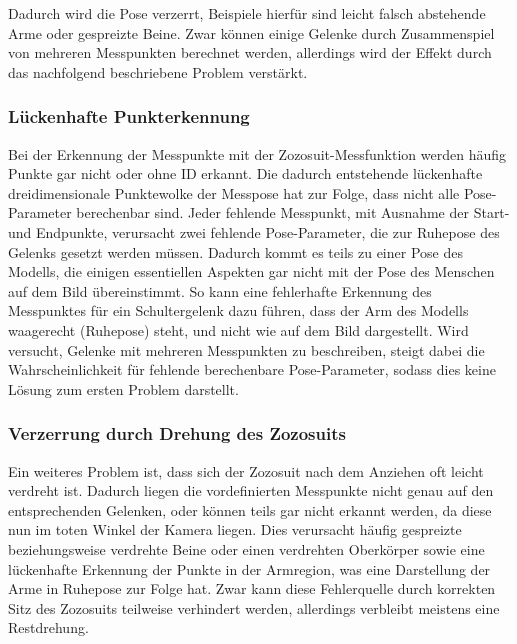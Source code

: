 Dadurch wird die Pose verzerrt, Beispiele hierfür sind leicht falsch abstehende Arme oder gespreizte Beine. Zwar können 
einige Gelenke durch Zusammenspiel von mehreren Messpunkten berechnet werden, allerdings 
wird der Effekt durch das nachfolgend beschriebene Problem verstärkt.

\subsubsection*{Lückenhafte Punkterkennung}
Bei der Erkennung der Messpunkte mit der Zozosuit-Messfunktion werden häufig Punkte gar nicht oder ohne
ID erkannt. Die dadurch entstehende lückenhafte dreidimensionale Punktewolke der Messpose hat zur Folge, dass
nicht alle Pose-Parameter berechenbar sind. Jeder fehlende Messpunkt, mit Ausnahme der Start- und Endpunkte, 
verursacht zwei fehlende Pose-Parameter, die zur Ruhepose des Gelenks gesetzt werden müssen. Dadurch kommt es teils
zu einer Pose des Modells, die einigen essentiellen Aspekten gar nicht mit der Pose des Menschen auf dem Bild übereinstimmt.
So kann eine fehlerhafte Erkennung des Messpunktes für ein Schultergelenk dazu führen, dass der Arm des Modells 
waagerecht (Ruhepose) steht, und nicht wie auf dem Bild dargestellt.
Wird versucht, Gelenke mit mehreren Messpunkten zu beschreiben, steigt dabei 
die Wahrscheinlichkeit für fehlende berechenbare Pose-Parameter, sodass dies keine Lösung zum ersten Problem darstellt.


\subsubsection*{Verzerrung durch Drehung des Zozosuits}
Ein weiteres Problem ist, dass sich der Zozosuit nach dem Anziehen oft leicht verdreht ist. Dadurch liegen die
vordefinierten Messpunkte nicht genau auf den entsprechenden Gelenken, oder können teils gar nicht erkannt werden,
da diese nun im toten Winkel der Kamera liegen. Dies verursacht häufig gespreizte beziehungsweise verdrehte Beine oder einen 
verdrehten Oberkörper sowie eine lückenhafte Erkennung der Punkte in der Armregion, was eine Darstellung der Arme
in Ruhepose zur Folge hat. Zwar kann diese Fehlerquelle durch korrekten Sitz des Zozosuits teilweise verhindert werden,
allerdings verbleibt meistens eine Restdrehung.


